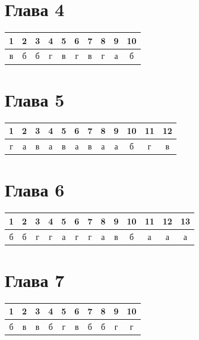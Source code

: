 \vspace{4mm}

\section*{Глава 4}

\noindent
\begin{tabular}{cccccccccc}
\toprule
1 & 2 & 3 & 4 & 5 & 6 & 7 & 8 & 9 & 10 \\
\midrule
в & б & б & г & в & г & в & г & а & б \\
\bottomrule
\end{tabular}

\vspace{4mm}

\section*{Глава 5}

\noindent
\begin{tabular}{cccccccccccc}
\toprule
1 & 2 & 3 & 4 & 5 & 6 & 7 & 8 & 9 & 10 & 11 & 12 \\
\midrule
г & а & в & а & в & а & в & а & а & б & г & в \\
\bottomrule
\end{tabular}

\vspace{4mm}

\section*{Глава 6}

\noindent
\begin{tabular}{ccccccccccccc}
\toprule
1 & 2 & 3 & 4 & 5 & 6 & 7 & 8 & 9 & 10 & 11 & 12 & 13 \\
\midrule
б & б & г & г & а & г & г & а & в & б & а & а & а \\
\bottomrule
\end{tabular}

\vspace{4mm}

\section*{Глава 7}

\noindent
\begin{tabular}{cccccccccc}
\toprule
1 & 2 & 3 & 4 & 5 & 6 & 7 & 8 & 9 & 10 \\
\midrule
б & в & в & б & г & в & б & б & г & г \\
\bottomrule
\end{tabular}

